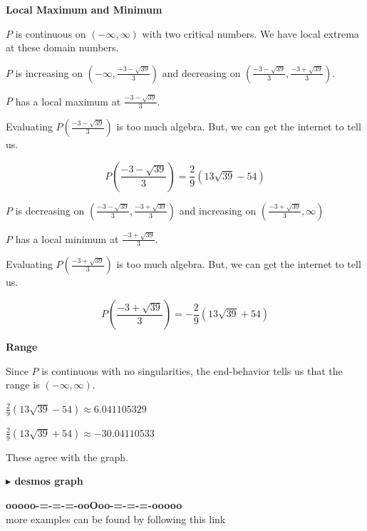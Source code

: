 \documentclass{ximera}
\begin{document}
\textbf{Local Maximum and Minimum}


$P$ is continuous on $(-\infty, \infty)$ with two critical numbers. We have local extrema at these domain numbers.







$P$ is increasing on $\left( -\infty, \frac{-3 - \sqrt{39}}{3} \right)$ and decreasing on $\left( \frac{-3 - \sqrt{39}}{3}, \frac{-3 + \sqrt{39}}{3} \right)$.

$P$ has a local maximum at $\frac{-3 - \sqrt{39}}{3}$.


Evaluating $P\left( \frac{-3 - \sqrt{39}}{3} \right)$ is too much algebra.  But, we can get the internet to tell us.

\[
P\left( \frac{-3 - \sqrt{39}}{3} \right) = \frac{2}{9} (13 \sqrt{39} - 54)
\]


$P$ is decreasing on $\left( \frac{-3 - \sqrt{39}}{3}, \frac{-3 + \sqrt{39}}{3} \right)$ and increasing on $\left( \frac{-3 + \sqrt{39}}{3}, \infty \right)$


$P$ has a local minimum at $\frac{-3 + \sqrt{39}}{3}$.



Evaluating $P\left( \frac{-3 + \sqrt{39}}{3} \right)$ is too much algebra.  But, we can get the internet to tell us.

\[
P\left( \frac{-3 + \sqrt{39}}{3} \right) = -\frac{2}{9} (13 \sqrt{39} + 54)
\]






\textbf{Range}

Since $P$ is continuous with no singularities, the end-behavior tells us that the range is $(-\infty, \infty)$.








$\frac{2}{9} (13 \sqrt{39} - 54) \approx 6.041105329$


$\frac{2}{9} (13 \sqrt{39} + 54) \approx -30.04110533$


These agree with the graph.






\textbf{\textcolor{blue!55!black}{$\blacktriangleright$ desmos graph}} 
\begin{center}
\end{center}















\begin{center}
\textbf{\textcolor{green!50!black}{ooooo-=-=-=-ooOoo-=-=-=-ooooo}} \\

more examples can be found by following this link\\ 

\end{center}
\end{document}
